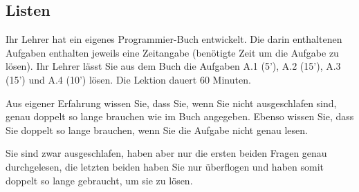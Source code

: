 \newtoggle{withbonus} \toggletrue{withbonus} %

\newcommand{\mycourse}{Grundlagenfach Informatik}
\newcommand{\myclass}{2. Klassen}
\newcommand{\mydate}{09. November 2023}

\lstset{style=python, basicstyle=\scriptsize\ttfamily,escapechar=!,xleftmargin=1.5em,
  frame=single,
  framexleftmargin=1.5em}

\clearpage
\begin{questions}
\section*{Listen}

Ihr Lehrer hat ein eigenes Programmier-Buch entwickelt. Die darin enthaltenen Aufgaben enthalten jeweils eine Zeitangabe (benötigte Zeit um die Aufgabe zu lösen). Ihr Lehrer lässt Sie aus dem Buch die Aufgaben A.1 (5'), A.2 (15'), A.3 (15') und A.4 (10') lösen. Die Lektion dauert 60 Minuten.

Aus eigener Erfahrung wissen Sie, dass Sie, wenn Sie nicht ausgeschlafen sind, genau doppelt so lange brauchen wie im Buch angegeben. Ebenso wissen Sie, dass Sie doppelt so lange brauchen, wenn Sie die Aufgabe nicht genau lesen. 

Sie sind zwar ausgeschlafen, haben aber nur die ersten beiden Fragen genau durchgelesen, die letzten beiden haben Sie nur überflogen und haben somit doppelt so lange gebraucht, um sie zu lösen. 

\end{questions}
